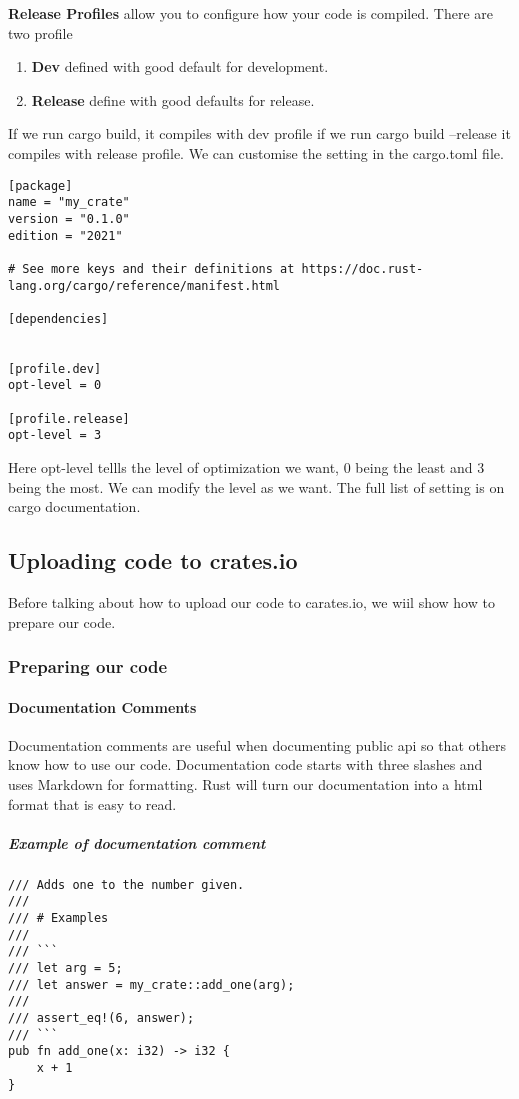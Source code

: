 \begin{definition}
    \textbf{Release Profiles} allow you to configure how your code is compiled. There are two profile\begin{enumerate}
        \item \textbf{Dev} defined with good default for development.
        \item \textbf{Release} define with good defaults for release.
    \end{enumerate}

    If we run cargo build, it compiles with dev profile if we run cargo build --release it compiles with release profile. 
    We can customise the setting in the cargo.toml file.

    \begin{lstlisting}
[package]
name = "my_crate"
version = "0.1.0"
edition = "2021"

# See more keys and their definitions at https://doc.rust-lang.org/cargo/reference/manifest.html

[dependencies]


[profile.dev]
opt-level = 0

[profile.release]
opt-level = 3
\end{lstlisting}

Here opt-level tellls the level of optimization we want, $0$ being the least and $3$ being the most. We can modify the level as we want. The full list of setting is on cargo documentation.


\subsection{Uploading code to crates.io}
Before talking about how to upload our code to carates.io, we wiil show how to prepare our code.
\subsubsection{Preparing our code}
\paragraph*{Documentation Comments}

Documentation comments are useful when documenting public api so that others know how to use our code. Documentation code starts with three slashes and uses Markdown for formatting. Rust will turn our documentation into a html format that is easy to read.

\subparagraph*{Example of documentation comment}\begin{lstlisting}
/// Adds one to the number given.
///
/// # Examples
///
/// ```
/// let arg = 5;
/// let answer = my_crate::add_one(arg);
///
/// assert_eq!(6, answer);
/// ```
pub fn add_one(x: i32) -> i32 {
    x + 1
}
\end{lstlisting}


\end{definition}
